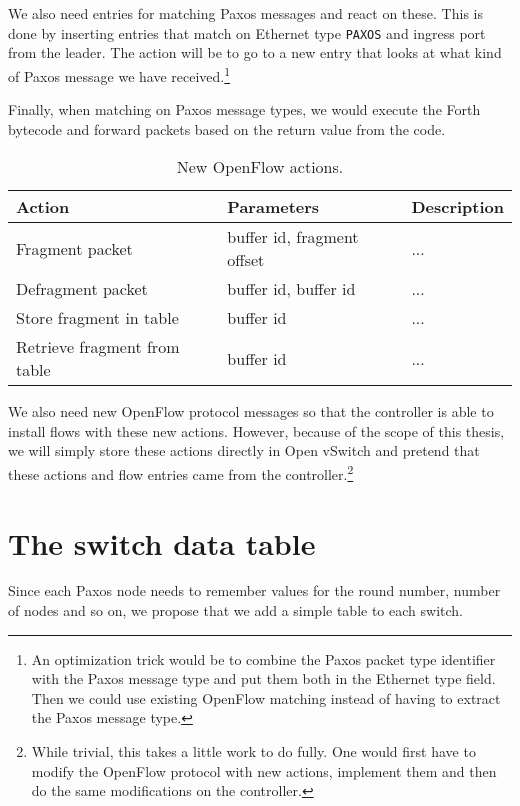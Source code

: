 We also need entries for matching Paxos messages and react on these.
This is done by inserting entries that match on Ethernet type
\texttt{PAXOS} and ingress port from the leader.
The action will be to go to a new entry that looks at what kind of Paxos
message we have received.\footnote{An optimization trick would be to
combine the Paxos packet type identifier with the Paxos message type and put
them both in the Ethernet type field.  Then we could use existing OpenFlow
matching instead of having to extract the Paxos message type.}

Finally, when matching on Paxos message types, we would execute the Forth
bytecode and forward packets based on the return value from the code.

\begin{table}[H]
  \centering
  \begin{tabular}{|l|l|l|}
    \hline \textbf{Action} & \textbf{Parameters} & \textbf{Description} \\
    \hline Fragment packet & buffer id, fragment offset & ... \\
    \hline Defragment packet & buffer id, buffer id & ... \\
    \hline Store fragment in table & buffer id & ... \\
    \hline Retrieve fragment from table & buffer id & ... \\
    \hline
  \end{tabular}

  \caption{New OpenFlow actions.}
  \label{table:openflow.new.actions}
\end{table}

We also need new OpenFlow protocol messages so that the controller is able
to install flows with these new actions.  However, because of the scope of
this thesis, we will simply store these actions directly in Open vSwitch and
pretend that these actions and flow entries came from the
controller.\footnote{While trivial, this takes a little work to do fully.
One would first have to modify the OpenFlow protocol with new actions,
implement them and then do the same modifications on the controller.}

\section{The switch data table}

Since each Paxos node needs to remember values for the round number, number
of nodes and so on, we propose that we add a simple table to each switch.

